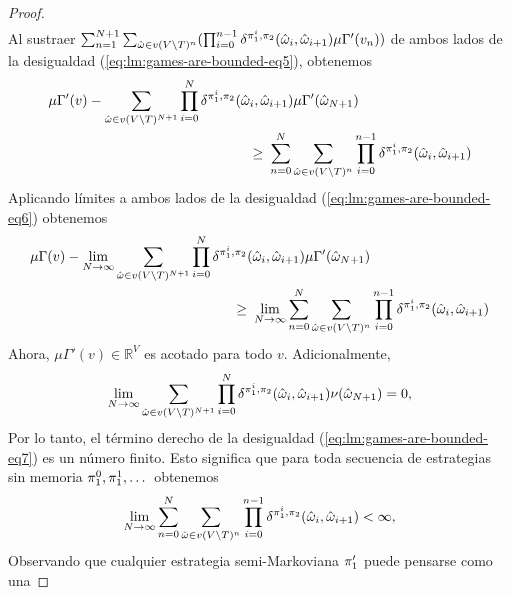 \begin{proof}
\begin{align}
  \end{align}
  Al sustraer
  $\sum^{N+1}_{n=1} \sum_{\hat{\omega} \in v(V \setminus T)^{n}}(\prod^{n-1}_{i=0} \delta^{\pi_{1}^i, \pi_{2}}(\hat{\omega}_i, \hat{\omega}_{i+1}) \mu \Gamma' (v_{n}))$
  de ambos lados de la desigualdad
  (\ref{eq:lm:games-are-bounded-eq5}), obtenemos
  \begin{align}
    \label{eq:lm:games-are-bounded-eq6}
    \mu \Gamma'(v)  - \sum_{\hat{\omega} \in v(V \setminus T)^{N+1}}\prod^{N}_{i=0} \delta^{\strat{1}^i, \strat{2}}(\hat{\omega}_i,\hat{\omega}_{i+1}) \mu \Gamma'(\hat{\omega}_{N+1})  \hspace{-6.5em}& \\
    \geq \ & \sum^{N}_{n=0} \sum_{\hat{\omega} \in v(V \setminus T)^n}\prod^{n-1}_{i=0} \delta^{\strat{1}^i, \strat{2}}(\hat{\omega}_i, \hat{\omega}_{i+1}) \notag
  \end{align}
  Aplicando límites a ambos lados de la desigualdad
  (\ref{eq:lm:games-are-bounded-eq6}) obtenemos
  \begin{align}
    \label{eq:lm:games-are-bounded-eq7}
    \mu \Gamma(v)  - \lim_{N \to \infty} \sum_{\hat{\omega} \in v(V \setminus T)^{N+1}}\prod^{N}_{i=0} \delta^{\strat{1}^i, \strat{2}}(\hat{\omega}_i,\hat{\omega}_{i+1}) \mu \Gamma'(\hat{\omega}_{N+1})  \hspace{-8.5em}& \\
    \geq \ & \lim_{N \to \infty} \sum^{N}_{n=0} \sum_{\hat{\omega} \in v(V \setminus T)^n}\prod^{n-1}_{i=0} \delta^{\strat{1}^i, \strat{2}}(\hat{\omega}_i, \hat{\omega}_{i+1}) \notag
  \end{align}
  Ahora,  $\mu \Gamma'(v) \in \mathbb{R}^V$ es acotado para todo $v$. Adicionalmente,
  \[
  \lim_{N \to \infty}\sum_{\hat{\omega} \in v(V \setminus T)^{N+1}}\prod^{N}_{i=0} \delta^{\pi_{1}^i, \pi_{2}}(\hat{\omega}_i,\hat{\omega}_{i+1}) \nu(\hat{\omega}_{N+1}) = 0,
  \]
  Por lo tanto, el término derecho de la desigualdad
  (\ref{eq:lm:games-are-bounded-eq7}) es un número finito.  Esto significa que
  para toda secuencia de estrategias sin memoria
  $\pi_{1}^0,\pi_{1}^1, \dots$ obtenemos
  \[
  \lim_{N \to \infty} \sum^{N}_{n=0} \sum_{\hat{\omega} \in v(V \setminus T)^n}\prod^{n-1}_{i=0} \delta^{\pi_{1}^i, \pi_{2}}(\hat{\omega}_i, \hat{\omega}_{i+1}) < \infty,
  \]
  Observando que cualquier estrategia semi-Markoviana $\pi_{1}'$ puede pensarse como una

\end{proof}
